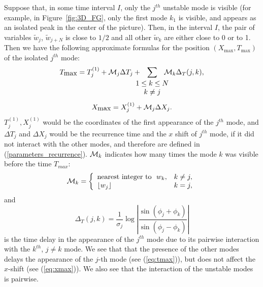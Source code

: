 \documentclass[12pt]{article}
\newcommand{\beq}{\begin{equation}}
\newcommand{\eeq}{\end{equation}}
\begin{document}
Suppose that, in some time interval $I$, only the $j^{th}$ unstable mode is visible (for example, in Figure~\ref{fig:3D_FG}, only the first mode $k_1$ is visible, and appears as an isolated peak in the center of the picture). Then, in the interval $I$, the pair of variables $\tilde w_j$, $\tilde w_{j+N}$ is close to $1/2$ and all other $\tilde w_k$ are either close to 0 or to 1. Then we have the following approximate formulas for the position $(X_{\mbox{max}},T_{\mbox{max}})$ of the isolated $j^{th}$ mode:
\begin{equation}
\label{eq:tmax}
T_{\mbox{max}} = T^{(1)}_j + {\cal M}_j \Delta T_j +\!\!\!\!\!\!\!\! \sum\limits_{\begin{array}{c}1\le k \le N \\ k\ne j \end{array}}\!\!\!\!\!\!\!\! {\cal M}_k \Delta_T(j,k),
\end{equation}
\beq\label{eq:xmax}
X_{\mbox{max}} = X^{(1)}_j + {\cal M}_j \Delta X_j. 
\eeq
$T^{(1)}_j,X^{(1)}_j$ would be the coordinates of the first appearance of the $j^{th}$ mode, and $\Delta T_j$ and $\Delta X_j$ would be the recurrence time and the $x$ shift of $j^{th}$ mode, if it did not interact with the other modes, and therefore are defined in (\ref{parameters_recurrence}). ${\cal M}_k$ indicates how many times the mode $k$ was visible before the time $T_{max}$:
\beq\label{number_appearances}
{\cal M}_k=\left\{\begin{array}{ll}  \mbox{nearest integer to} \ \ w_k, & k\ne j, \\
\lfloor w_j \rfloor & k=j, \end{array} \right.
\eeq
and
\beq
\Delta_T(j,k) = \frac{1}{\sigma_j}\log \left|\frac{\sin(\phi_j + \phi_k )}{\sin (\phi_j-\phi_k) }\right|
\eeq
is the time delay in the appearance of the $j^{th}$ mode due to its pairwise interaction with the $k^{th}$, $j\ne k$ mode. 
We see that that the presence of the other modes delays the appearance of the $j$-th mode (see (\ref{eq:tmax})), but does not affect the $x$-shift (see (\ref{eq:xmax})). We also see that the interaction of the unstable modes is pairwise. 
\end{document}
